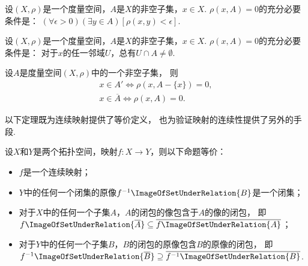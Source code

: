 \begin{theorem}
设\((X,\rho)\)是一个度量空间，\(A\)是\(X\)的非空子集，\(x \in X\).
\(\rho(x,A) = 0\)的充分必要条件是：
\((\forall\epsilon>0)(\exists y \in A)[\rho(x,y)<\epsilon]\).
\end{theorem}

\begin{corollary}
设\((X,\rho)\)是一个度量空间，\(A\)是\(X\)的非空子集，\(x \in X\).
\(\rho(x,A) = 0\)的充分必要条件是：
对于\(x\)的任一邻域\(U\)，总有\(U \cap A \neq \emptyset\).
\end{corollary}

\begin{theorem}
设\(A\)是度量空间\((X,\rho)\)中的一个非空子集，
则\begin{gather*}
	x \in A'
	\iff
	\rho(x,A-\{x\})=0, \\
	x \in \overline{A}
	\iff
	\rho(x,A)=0.
\end{gather*}
\end{theorem}

以下定理既为连续映射提供了等价定义，
也为验证映射的连续性提供了另外的手段.

\begin{theorem}
设\(X\)和\(Y\)是两个拓扑空间，映射\(f\colon X \to Y\)，则以下命题等价：
\begin{itemize}
	\item \(f\)是一个连续映射；
	\item \(Y\)中的任何一个闭集的原像\(f^{-1}\ImageOfSetUnderRelation{B}\)是一个闭集；
	\item 对于\(X\)中的任何一个子集\(A\)，\(A\)的闭包的像包含于\(A\)的像的闭包，
	即\(f\ImageOfSetUnderRelation{\overline{A}}
	\subseteq
	\overline{f\ImageOfSetUnderRelation{A}}\)；
	\item 对于\(Y\)中的任何一个子集\(B\)，\(B\)的闭包的原像包含\(B\)的原像的闭包，
	即\(f^{-1}\ImageOfSetUnderRelation{\overline{B}}
	\supseteq
	\overline{f^{-1}\ImageOfSetUnderRelation{B}}\).
\end{itemize}
\end{theorem}
